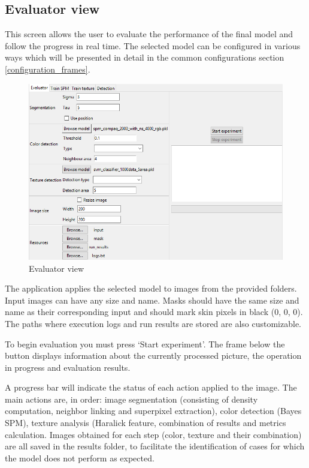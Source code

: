\documentclass[12pt]{report}
\begin{document}
	\subsection{Evaluator view}
	
	This screen allows the user to evaluate the performance of the final model and follow the progress in real time. The selected model can be configured in various ways which will be presented in detail in the common configurations section \ref{configuration_frames}.
	
	\begin{figure}[h!]
		\centering
		\includegraphics[width=\linewidth]{manual/evaluator_view.png}
		\caption{Evaluator view}
	\end{figure}
	
	The application applies the selected model to images from the provided folders. Input images can have any size and name. Masks should have the same size and name as their corresponding input and should mark skin pixels in black (0, 0, 0). The paths where execution logs and run results are stored are also customizable.
	
	To begin evaluation you must press ‘Start experiment’. The frame below the button displays information about the currently processed picture, the operation in progress and evaluation results. 
	
	A progress bar will indicate the status of each action applied to the image. The main actions are, in order: image segmentation (consisting of density computation, neighbor linking and superpixel extraction), color detection (Bayes SPM), texture analysis (Haralick feature, combination of results and metrics calculation. Images obtained for each step (color, texture and their combination) are all saved in the results folder, to facilitate the identification of cases for which the model does not perform as expected.
	
\end{document}
